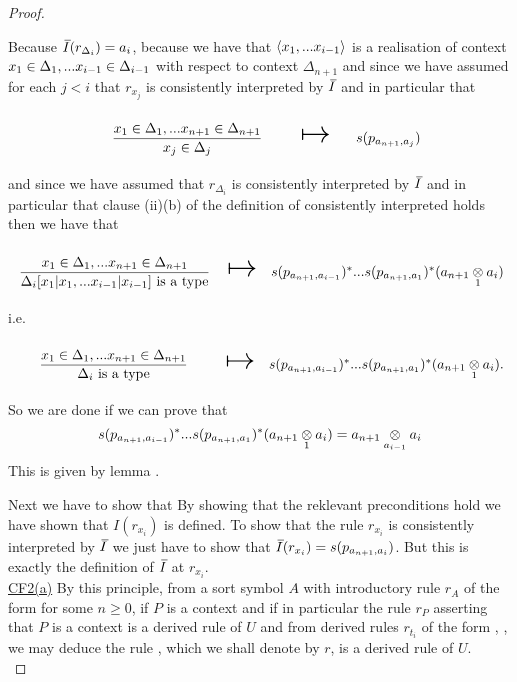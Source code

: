 \begin{proof}
\begin{enumerate}
Because $\Ibar(r_{\Delta_i}) = a_i$,
because  we have that
$\langle x_1,...x_{i-1}\rangle$ is a realisation of context $x_1 \in \Delta_1,... x_{i-1} \in \Delta_{i-1}$ with respect to context $\Delta_{n+1}$ 
and since we have assumed for each $j<i$ that $r_{x_j}$ is consistently interpreted by $\Ibar$ and in particular
that
\begin{equation*}
\begin{array}{c c c }
\forceSOURCEwidth & & \forceTARGETwidth \\ [-0.1cm]
\gatdisplayrule{\xDelta{n+1}}{\ofT{x_j}{\Delta_j}}  & \Imapsto & s(p_{a_{n+1},a_j}) \\ [0.4cm]
\end{array}
\end{equation*}
and since we have assumed that $r_{\Delta_i}$ is consistently interpreted by $\Ibar$ and in particular that clause (ii)(b) of the definition of consistently interpreted holds
then we have that
\begin{equation*}
\begin{array}{c c c}
\forceSOURCEwidth & & \forceTARGETwidth \\ [-0.1cm]
\gatdisplayrule{\xDelta{n+1}}{\isT{\Delta_i[x_1|x_1,...x_{i-1}|x_{i-1}]}}  & \Imapsto & \deltaimappedlong \\ [0.4cm]
\end{array}
\end{equation*}
i.e.
\begin{equation*}
\begin{array}{c c c}
\forceSOURCEwidth & & \forceTARGETwidth \\ [-0.1cm]
\gatdisplayrule{\xDelta{n+1}}{\isT{\Delta_i}}  & \Imapsto & \deltaimappedlong.\\ [0.4cm]
\end{array}
\end{equation*}
So we are done if we can prove that
\begin{equation*}
s(p_{a_{n+1},a_{i-1}})^*...s(p_{a_{n+1},a_1})^*(a_{n+1} \underset{1}{\otimes} a_i) = a_{n+1} \underset{a_{i-1}}{\otimes} a_i
\end{equation*}  
This is given by lemma .
\end{enumerate}
Next we have to show that 
By showing that the reklevant preconditions hold we have shown that $I(r_{x_i})$ is defined. 
To show that the rule $r_{x_i}$ is consistently interpreted by $\Ibar$ we just have to show that
 $\Ibar(r_{x_i})=s(p_{a_{n+1},a_i})$. But this is exactly the definition of $\Ibar$ at $r_{x_i}$. \\

\underline{CF2(a)}
By this principle, from a sort symbol $A$ with introductory rule $r_A$ of the form  for some $n \geq 0$, if
$P$ is a context and if in particular the rule $r_P$ asserting that $P$ is a context is a derived rule of $U$
and from derived rules $r_{t_i}$ of the form , \foreachi, we may deduce
the rule , which we shall denote by $r$, is a derived rule of $U$. \\


\end{proof}
